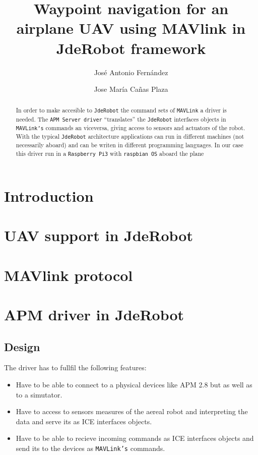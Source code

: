 \documentclass{llncs}
\begin{document}
\title{Waypoint navigation for an airplane UAV using MAVlink in JdeRobot framework}
\author{José Antonio Fernández \and Jose María Cañas Plaza}
\maketitle

\begin{abstract}
In order to make accesible to \texttt{JdeRobot} the command sets of \texttt{MAVLink} a driver is needed. The \texttt{APM Server driver} ``translates'' the \texttt{JdeRobot} interfaces objects in \texttt{MAVLink's} commands an viceversa, giving access to sensors and actuators of the robot. With the typical \texttt{JdeRobot} architecture applications can run in different machines (not necessarily aboard) and can be writen in different programming languages. 
In our case this driver run in a \texttt{Raspberry Pi3} with \texttt{raspbian OS} aboard the plane
\end{abstract}

\section{Introduction}


\section{UAV support in JdeRobot}

\section{MAVlink protocol}

\section{APM driver in JdeRobot}

\subsection{Design}
\label{sec:design}

The driver has to fullfil the following features:

\begin{itemize}
\item Have to be able to connect to a physical devices like APM 2.8 but as well as to a simutator.
\item Have to access to sensors measures of the aereal robot and interpreting the data and serve its as ICE interfaces objects.
\item Have to be able to recieve incoming commands as ICE interfaces objects and send its to the devices as \texttt{MAVLink's} commands.
\end{itemize}
\end{document}
